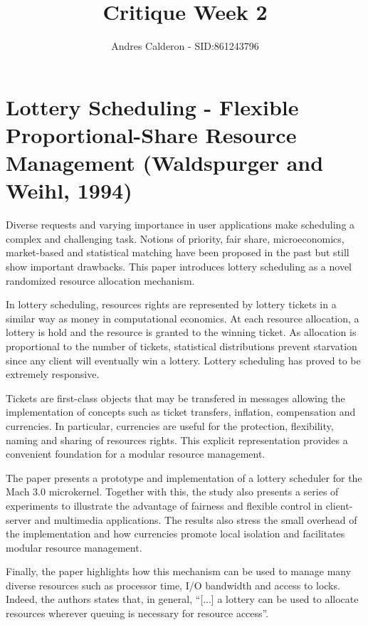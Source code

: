\documentclass[a4paper,10pt]{scrartcl}
\title{Critique Week 2}
\author{Andres Calderon - SID:861243796}
\begin{document}
\maketitle
\thispagestyle{empty}
\linenumbers

\section*{Lottery Scheduling - Flexible Proportional-Share Resource Management (Waldspurger and Weihl, 1994)}

Diverse requests and varying importance in user applications make scheduling a complex and challenging task. Notions of priority, fair share, microeconomics, market-based and statistical matching have been proposed in the past but still show important drawbacks. This paper introduces lottery scheduling as a novel randomized resource allocation mechanism.

In lottery scheduling, resources rights  are represented by lottery tickets in a similar way as money in computational economics. At each resource allocation, a lottery is hold and the resource is granted to the winning ticket. As allocation is proportional to the number of tickets, statistical distributions prevent starvation since any client will eventually win a lottery.  Lottery scheduling has proved to be extremely responsive.

Tickets are first-class objects that may be transfered in messages allowing the implementation of concepts such as ticket transfers, inflation, compensation and currencies. In particular, currencies are useful for the protection, flexibility, naming and sharing of resources rights. This explicit representation provides a convenient foundation for a modular resource management.

The paper presents a prototype and implementation of a lottery scheduler for the Mach 3.0 microkernel. Together with this, the study also presents a series of experiments to illustrate the advantage of fairness and flexible control in client-server and multimedia applications.  The results also stress the small overhead of the implementation and how currencies promote local isolation and facilitates modular resource management.  

Finally, the paper highlights how this mechanism can be used to manage many diverse resources such as processor time, I/O bandwidth and access to locks.  Indeed, the authors states that, in general, ``[...] a lottery can be used to allocate resources wherever queuing is necessary for resource access''.
\end{document}
